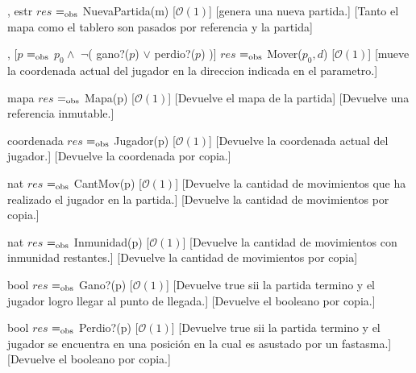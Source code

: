 \documentclass[10pt,a4paper]{article}
\begin{document}
\begin{Interfaz}
    {, }{estr}%
    {$res$ $=_{\mathrm{obs}}$ NuevaPartida(m)}%
    [$\mathcal{O}(1)$]
    [genera una nueva partida.]
    [Tanto el mapa como el tablero son pasados por referencia y la partida]
    
    {, }{}%
    [$p$ $=_{\mathrm{obs}}$ $p_0 \land$ $\neg$( gano?($p$) $\lor$ perdio?($p$) )]%
    {$res$ $=_{\mathrm{obs}}$ Mover($p_0, d$)}
    [$\mathcal{O}(1)$]
    [mueve la coordenada actual del jugador en la direccion indicada en el parametro.]
    
    {}{mapa}%
    {$res$ $=_{\mathrm{obs}}$ Mapa(p)}%
    [$\mathcal{O}(1)$]
    [Devuelve el mapa de la partida]
    [Devuelve una referencia inmutable.]
    
    {}{coordenada}%
    {$res$ $=_{\mathrm{obs}}$ Jugador(p)}
    [$\mathcal{O}(1)$]
    [Devuelve la coordenada actual del jugador.]
    [Devuelve la coordenada por copia.]
    
    {}{nat}%
    {$res$ $=_{\mathrm{obs}}$ CantMov(p)}
    [$\mathcal{O}(1)$]
    [Devuelve la cantidad de movimientos que ha realizado el jugador en la partida.]
    [Devuelve la cantidad de movimientos por copia.]
    
    {}{nat}%
    {$res$ $=_{\mathrm{obs}}$ Inmunidad(p)}
    [$\mathcal{O}(1)$]
    [Devuelve la cantidad de movimientos con inmunidad restantes.]
    [Devuelve la cantidad de movimientos por copia]
    
    {}{bool}%
    {$res$ $=_{\mathrm{obs}}$ Gano?(p)}
    [$\mathcal{O}(1)$]
    [Devuelve true sii la partida termino y el jugador logro llegar al punto de llegada.]
    [Devuelve el booleano por copia.]
    
    {}{bool}%
    {$res$ $=_{\mathrm{obs}}$ Perdio?(p)}
    [$\mathcal{O}(1)$]
    [Devuelve true sii la partida termino y el jugador se encuentra en una posición en la cual es asustado por un fastasma.]
    [Devuelve el booleano por copia.]
    
\end{Interfaz}
\end{document}
